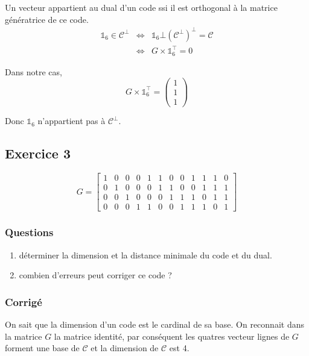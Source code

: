 \documentclass[a4paper,10pt,twocolumn]{article}
\theoremstyle{break}
\newcommand{\code}[1]{\mathcal{#1}}
\newcommand{\C}{\code{C}}
\begin{document}
Un vecteur appartient au dual d'un code ssi il est orthogonal à la matrice génératrice de ce code.
\begin{eqnarray*}
 \mathbb{1}_6 \in \C^\bot & \Longleftrightarrow & \mathbb{1}_6 \bot (\C^\bot)^\bot = \C \\
 & \Longleftrightarrow & G \times \mathbb{1}_6^\top = 0
\end{eqnarray*}

Dans notre cas, 
$$ G \times \mathbb{1}_6^\top = \begin{pmatrix} 1 \\ 1 \\ 1 \end{pmatrix} $$

Donc $\mathbb{1}_6$ n'appartient pas à $\C^\bot$.

\subsection*{Exercice 3}
$$ G = 
\left[
\begin{array}{cccccccccccc}
1 & 0 & 0 & 0 & 1 & 1 & 0 & 0 & 1 & 1 & 1 & 0 \\
0 & 1 & 0 & 0 & 0 & 1 & 1 & 0 & 0 & 1 & 1 & 1 \\
0 & 0 & 1 & 0 & 0 & 0 & 1 & 1 & 1 & 0 & 1 & 1 \\
0 & 0 & 0 & 1 & 1 & 0 & 0 & 1 & 1 & 1 & 0 & 1
\end{array}
\right]
$$

\subsubsection*{Questions}
\begin{enumerate}
 \item déterminer la dimension et la distance minimale du code et du dual.
 \item combien d'erreurs peut corriger ce code ?
\end{enumerate}

\subsubsection*{Corrigé}
On sait que la dimension d'un code est le cardinal de sa base. On reconnait dans la matrice $G$ la matrice identité, par conséquent les quatres vecteur lignes de $G$ forment une base de $\C$ et la dimension de $\C$ est 4.
\end{document}
